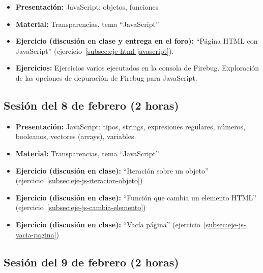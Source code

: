 \documentclass[a4paper,12pt]{report}
\begin{document}
\begin{itemize}
\item \textbf{Presentación:} JavaScript: objetos, funciones
\item \textbf{Material:} Transparencias, tema ``JavaScript''
\item \textbf{Ejercicio (discusión en clase y entrega en el foro):} ``Página HTML con JavaScript'' (ejercicio~\ref{subsec:eje-html-javascript}).
\item \textbf{Ejercicios:} Ejercicios varios ejecutados en la consola de Firebug. Exploración de las opciones de depuración de Firebug para JavaScript.
\end{itemize}

\subsection{Sesión del 8 de febrero (2 horas)}

\begin{itemize}
\item \textbf{Presentación:} JavaScript: tipos, strings, expresiones regulares, números, booleanos, vectores (arrays), variables.
\item \textbf{Material:} Transparencias, tema ``JavaScript''
\item \textbf{Ejercicio (discusión en clase):} ``Iteración sobre un objeto'' (ejercicio~\ref{subsec:eje-js-iteracion-objeto})
\item \textbf{Ejercicio (discusión en clase):} ``Función que cambia un elemento HTML'' (ejercicio~\ref{subsec:eje-js-cambia-elemento})
\item \textbf{Ejercicio (discusión en clase):} ``Vacía página'' (ejercicio~\ref{subsec:eje-js-vacia-pagina})
\end{itemize}


\subsection{Sesión del 9 de febrero (2 horas)}
\end{document}
